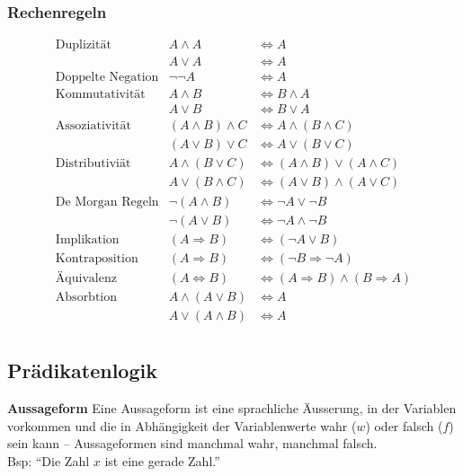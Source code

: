 \subsubsection{Rechenregeln}
\settowidth{\MyLenA}{Doppelte Negation~~}
\begin{equation*}
\begin{array}{lrl}
	\mbox{Duplizität}			& A \wedge A				& \Leftrightarrow A\\
								& A \vee A					& \Leftrightarrow A\\
	\mbox{Doppelte Negation}	& \neg\neg A 				& \Leftrightarrow A\\
	\mbox{Kommutativität}		& A \wedge B 				& \Leftrightarrow B \wedge A\\
								& A \vee B					& \Leftrightarrow B \vee A\\
	\mbox{Assoziativität} 		& (A \wedge B) \wedge C 	& \Leftrightarrow A \wedge (B \wedge C)\\
								& (A \vee B) \vee C 		& \Leftrightarrow A \vee (B \vee C)\\
	\mbox{Distributiviät}		& A \wedge (B \vee C) 		& \Leftrightarrow (A \wedge B) \vee (A \wedge C)\\
								& A \vee (B \wedge C) 		& \Leftrightarrow (A \vee B) \wedge (A \vee C)\\
	\mbox{De Morgan Regeln}		& \neg (A \wedge B) 		& \Leftrightarrow \neg A \vee \neg B\\
								& \neg (A \vee B) 			& \Leftrightarrow \neg A \wedge \neg B\\
	\mbox{Implikation}			& (A \Rightarrow B) 		& \Leftrightarrow (\neg A \vee B)\\
	\mbox{Kontraposition}		& (A \Rightarrow B) 		& \Leftrightarrow (\neg B \Rightarrow \neg A)\\
	\mbox{Äquivalenz}			& (A \Leftrightarrow B)		& \Leftrightarrow (A \Rightarrow B) \wedge (B \Rightarrow A)\\
	\mbox{Absorbtion}			& A \wedge (A \vee B)		& \Leftrightarrow A\\
								& A \vee (A \wedge B)		& \Leftrightarrow A\\
\end{array}
\end{equation*}

\subsection{Prädikatenlogik}
\textbf{Aussageform} Eine Aussageform ist eine sprachliche Äusserung, in 
der Variablen vorkommen und die in Abhängigkeit der Variablenwerte wahr ($w$) oder falsch ($f$) 
sein kann -- Aussageformen sind manchmal wahr, manchmal falsch.\\
Bsp: \enquote{Die Zahl $x$ ist eine gerade Zahl.}

